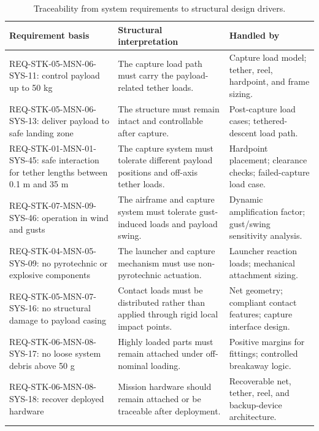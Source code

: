\begin{table}[H]
\centering
\small
\caption{Traceability from system requirements to structural design drivers.}
\label{tab:structural_req_traceability}
\begin{tabularx}{\textwidth}{@{}p{}p{}X@{}}
\toprule
\textbf{Requirement basis} & \textbf{Structural interpretation} & \textbf{Handled by} \\
\midrule

REQ-STK-05-MSN-06-SYS-11:
control payload up to 50 kg
&
The capture load path must carry the payload-related tether loads.
&
Capture load model; tether, reel, hardpoint, and frame sizing. \\

REQ-STK-05-MSN-06-SYS-13:
deliver payload to safe landing zone
&
The structure must remain intact and controllable after capture.
&
Post-capture load cases; tethered-descent load path. \\

REQ-STK-01-MSN-01-SYS-45:
safe interaction for tether lengths between 0.1 m and 35 m
&
The capture system must tolerate different payload positions and off-axis tether loads.
&
Hardpoint placement; clearance checks; failed-capture load case. \\

REQ-STK-07-MSN-09-SYS-46:
operation in wind and gusts
&
The airframe and capture system must tolerate gust-induced loads and payload swing.
&
Dynamic amplification factor; gust/swing sensitivity analysis. \\

REQ-STK-04-MSN-05-SYS-09:
no pyrotechnic or explosive components
&
The launcher and capture mechanism must use non-pyrotechnic actuation.
&
Launcher reaction loads; mechanical attachment sizing. \\

REQ-STK-05-MSN-07-SYS-16:
no structural damage to payload casing
&
Contact loads must be distributed rather than applied through rigid local impact points.
&
Net geometry; compliant contact features; capture interface design. \\

REQ-STK-06-MSN-08-SYS-17:
no loose system debris above 50 g
&
Highly loaded parts must remain attached under off-nominal loading.
&
Positive margins for fittings; controlled breakaway logic. \\

REQ-STK-06-MSN-08-SYS-18:
recover deployed hardware
&
Mission hardware should remain attached or be traceable after deployment.
&
Recoverable net, tether, reel, and backup-device architecture. \\


\end{tabularx}
\end{table}
